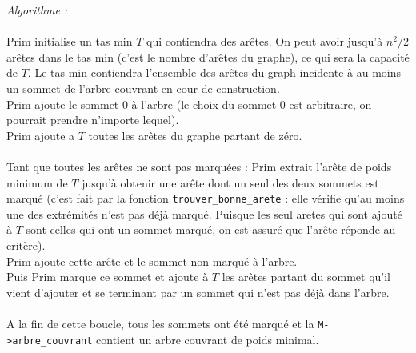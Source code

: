 \documentclass[a4paper,11pt]{article}
\begin{document}
\textit{Algorithme : } \\
\\
Prim initialise un tas min $T$ qui contiendra des arêtes. On peut avoir jusqu'à $n^2/2$ arêtes dans le tas min (c'est le nombre d'arêtes du graphe), ce qui sera la capacité de $T$. Le tas min contiendra l'ensemble des arêtes du graph incidente à au moins un sommet de l'arbre couvrant en cour de construction.\\
Prim ajoute le sommet 0 à l'arbre (le choix du sommet 0 est arbitraire, on pourrait prendre n'importe lequel).\\
Prim ajoute a $T$ toutes les arêtes du graphe partant de zéro.\\
\\
Tant que toutes les arêtes ne sont pas marquées :
Prim extrait l'arête de poids minimum de $T$ jusqu'à obtenir une arête dont un seul des deux sommets est marqué (c'est fait par la fonction \texttt{trouver\_bonne\_arete} : elle vérifie qu'au moins une des extrémités n'est pas déjà marqué. Puisque les seul aretes qui sont ajouté à $T$ sont celles qui ont un sommet marqué, on est assuré que l'arête réponde au critère).\\
Prim ajoute cette arête et le sommet non marqué à l'arbre.\\
Puis Prim marque ce sommet et ajoute à $T$ les arêtes partant du sommet qu'il vient d'ajouter et se terminant par un sommet qui n'est pas déjà dans l'arbre.\\
\\
A la fin de cette boucle, tous les sommets ont été marqué et la \texttt{M->arbre\_couvrant} contient un arbre couvrant de poids minimal.\\
\end{document}
